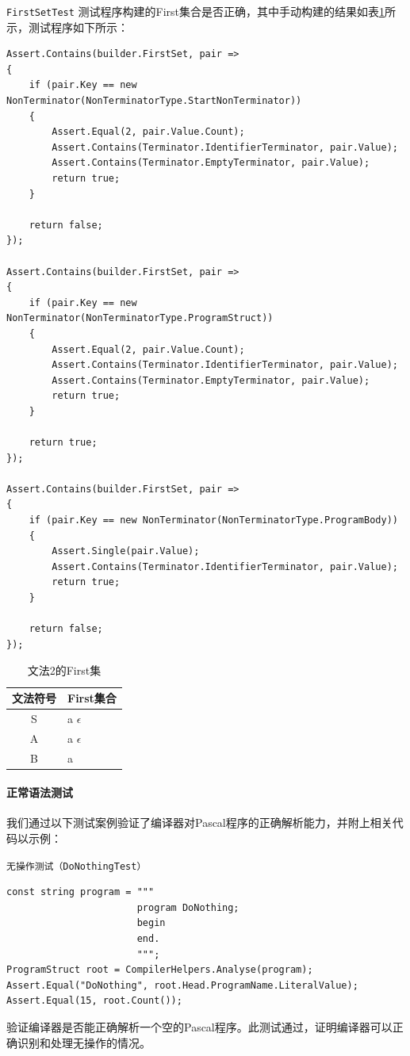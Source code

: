 \documentclass[../main.tex]{subfiles}
\begin{document}
\texttt{FirstSetTest} 测试程序构建的First集合是否正确，其中手动构建的结果如表\ref{tab:grammar_2_first}所示，测试程序如下所示：

\begin{lstlisting}[style=csharp]
Assert.Contains(builder.FirstSet, pair =>
{
    if (pair.Key == new NonTerminator(NonTerminatorType.StartNonTerminator))
    {
        Assert.Equal(2, pair.Value.Count);
        Assert.Contains(Terminator.IdentifierTerminator, pair.Value);
        Assert.Contains(Terminator.EmptyTerminator, pair.Value);
        return true;
    }

    return false;
});

Assert.Contains(builder.FirstSet, pair =>
{
    if (pair.Key == new NonTerminator(NonTerminatorType.ProgramStruct))
    {
        Assert.Equal(2, pair.Value.Count);
        Assert.Contains(Terminator.IdentifierTerminator, pair.Value);
        Assert.Contains(Terminator.EmptyTerminator, pair.Value);
        return true;
    }

    return true;
});

Assert.Contains(builder.FirstSet, pair =>
{
    if (pair.Key == new NonTerminator(NonTerminatorType.ProgramBody))
    {
        Assert.Single(pair.Value);
        Assert.Contains(Terminator.IdentifierTerminator, pair.Value);
        return true;
    }

    return false;
});
\end{lstlisting}

\begin{table}[h] 
\centering %
\caption{文法2的First集}
\label{tab:grammar_2_first}
\begin{tabular}{|c|p{10cm}|} %
\hline
\textbf{文法符号} & \textbf{First集合} \\ 
\hline
S & a $\epsilon$\\ 
A & a $\epsilon$\\ 
B & a \\ 
\hline
\end{tabular}
\end{table}

\paragraph{正常语法测试}
我们通过以下测试案例验证了编译器对Pascal程序的正确解析能力，并附上相关代码以示例：

\texttt{无操作测试（DoNothingTest）}
\begin{lstlisting}[style=csharp]
const string program = """
                       program DoNothing;
                       begin
                       end.
                       """;
ProgramStruct root = CompilerHelpers.Analyse(program);
Assert.Equal("DoNothing", root.Head.ProgramName.LiteralValue);
Assert.Equal(15, root.Count());
\end{lstlisting}
验证编译器是否能正确解析一个空的Pascal程序。此测试通过，证明编译器可以正确识别和处理无操作的情况。
\end{document}
